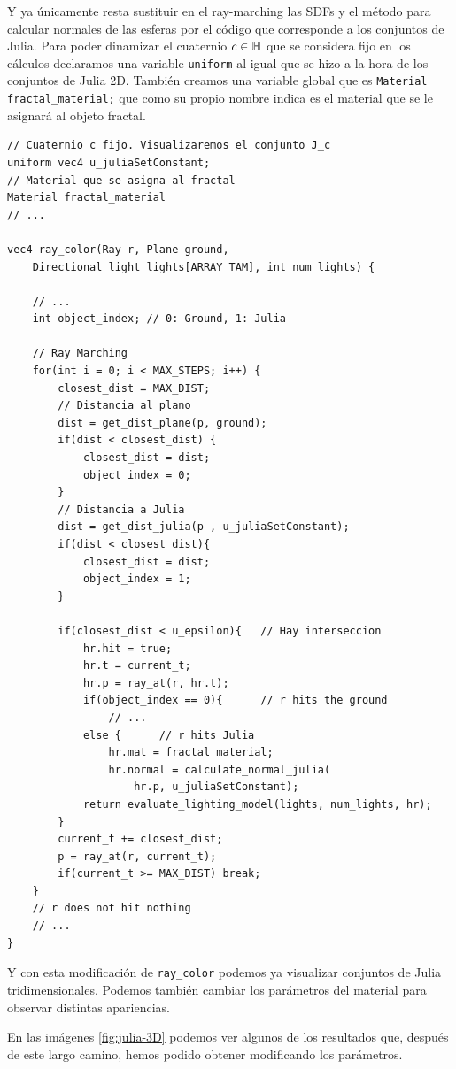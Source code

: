 Y ya únicamente resta sustituir en el ray-marching las SDFs y el método para calcular normales de las esferas por el código que corresponde a los conjuntos de Julia. Para poder dinamizar el cuaternio $c\in\mathbb{H}$ que se considera fijo en los cálculos declaramos una variable \verb|uniform| al igual que se hizo a la hora de los conjuntos de Julia 2D. También creamos una variable global que es \verb|Material fractal_material;| que como su propio nombre indica es el material que se le asignará al objeto fractal.

\begin{lstlisting}
// Cuaternio c fijo. Visualizaremos el conjunto J_c
uniform vec4 u_juliaSetConstant;
// Material que se asigna al fractal
Material fractal_material
// ...

vec4 ray_color(Ray r, Plane ground, 
    Directional_light lights[ARRAY_TAM], int num_lights) {

    // ... 
    int object_index; // 0: Ground, 1: Julia

    // Ray Marching
    for(int i = 0; i < MAX_STEPS; i++) {
        closest_dist = MAX_DIST;
        // Distancia al plano
        dist = get_dist_plane(p, ground);
        if(dist < closest_dist) {
            closest_dist = dist;
            object_index = 0;
        }
        // Distancia a Julia
        dist = get_dist_julia(p , u_juliaSetConstant);
        if(dist < closest_dist){
            closest_dist = dist;
            object_index = 1;
        }

        if(closest_dist < u_epsilon){   // Hay interseccion
            hr.hit = true;
            hr.t = current_t;
            hr.p = ray_at(r, hr.t);
            if(object_index == 0){      // r hits the ground
                // ... 
            else {      // r hits Julia
                hr.mat = fractal_material;
                hr.normal = calculate_normal_julia(
                    hr.p, u_juliaSetConstant);
            return evaluate_lighting_model(lights, num_lights, hr);
        }
        current_t += closest_dist;
        p = ray_at(r, current_t);
        if(current_t >= MAX_DIST) break;
    }
    // r does not hit nothing
    // ... 
}
\end{lstlisting}

Y con esta modificación de \verb|ray_color| podemos ya visualizar conjuntos de Julia tridimensionales. Podemos también cambiar los parámetros del material para observar distintas apariencias. 

En las imágenes \ref{fig:julia-3D} podemos ver algunos de los resultados que, después de este largo camino, hemos podido obtener modificando los parámetros.

